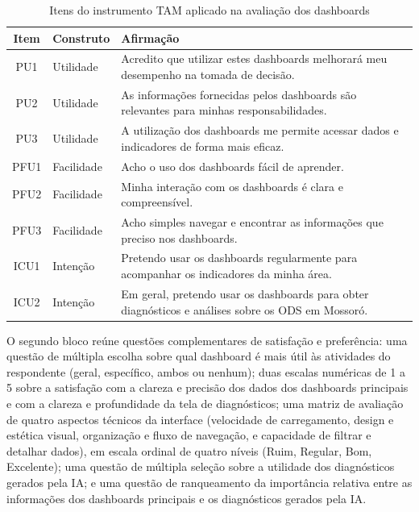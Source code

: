 \begin{table}[h!]
    \centering
    \caption{Itens do instrumento TAM aplicado na avaliação dos dashboards}
    \label{tab:itens-tam}
    \begin{tabular}{clp{10.5cm}}
        \hline
        \textbf{Item} & \textbf{Construto} & \textbf{Afirmação} \\
        \hline
        PU1 & Utilidade & Acredito que utilizar estes dashboards melhorará meu desempenho na tomada de decisão. \\
        PU2 & Utilidade & As informações fornecidas pelos dashboards são relevantes para minhas responsabilidades. \\
        PU3 & Utilidade & A utilização dos dashboards me permite acessar dados e indicadores de forma mais eficaz. \\
        PFU1 & Facilidade & Acho o uso dos dashboards fácil de aprender. \\
        PFU2 & Facilidade & Minha interação com os dashboards é clara e compreensível. \\
        PFU3 & Facilidade & Acho simples navegar e encontrar as informações que preciso nos dashboards. \\
        ICU1 & Intenção & Pretendo usar os dashboards regularmente para acompanhar os indicadores da minha área. \\
        ICU2 & Intenção & Em geral, pretendo usar os dashboards para obter diagnósticos e análises sobre os ODS em Mossoró. \\
        \hline
    \end{tabular}
\end{table}

O segundo bloco reúne questões complementares de satisfação e preferência: uma questão de múltipla escolha sobre qual dashboard é mais útil às atividades do respondente (geral, específico, ambos ou nenhum); duas escalas numéricas de 1 a 5 sobre a satisfação com a clareza e precisão dos dados dos dashboards principais e com a clareza e profundidade da tela de diagnósticos; uma matriz de avaliação de quatro aspectos técnicos da interface (velocidade de carregamento, design e estética visual, organização e fluxo de navegação, e capacidade de filtrar e detalhar dados), em escala ordinal de quatro níveis (Ruim, Regular, Bom, Excelente); uma questão de múltipla seleção sobre a utilidade dos diagnósticos gerados pela IA; e uma questão de ranqueamento da importância relativa entre as informações dos dashboards principais e os diagnósticos gerados pela IA.

